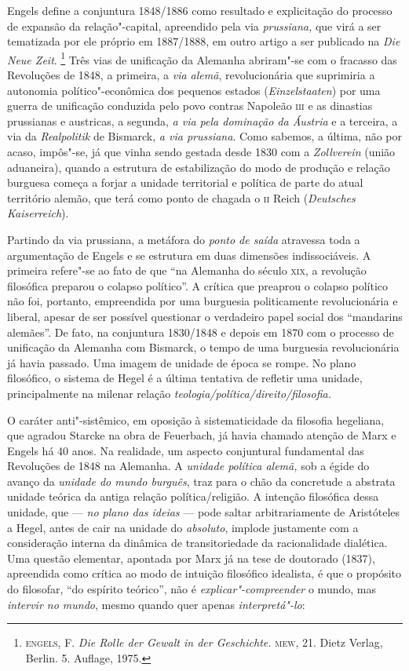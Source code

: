 Engels define a conjuntura 1848/1886 como resultado e explicitação do
processo de expansão da relação"-capital, apreendido pela via
\emph{prussiana,} que virá a ser tematizada por ele próprio em
1887/1888, em outro artigo a ser publicado na \emph{Die Neue Zeit}.
\footnote{\textsc{engels}, F. \emph{Die Rolle der Gewalt in der Geschichte.} \textsc{mew},
  21. Dietz Verlag, Berlin. 5. Auflage, 1975.} Três vias de unificação
da Alemanha abriram"-se com o fracasso das Revoluções de 1848, a
primeira, a \emph{via alemã}, revolucionária que suprimiria a autonomia
político"-econômica dos pequenos estados (\emph{Einzelstaaten}) por uma
guerra de unificação conduzida pelo povo contras Napoleão \textsc{iii} e as
dinastias prussianas e austricas, a segunda, \emph{a via pela dominação
da Áustria} e a terceira, a via da \emph{Realpolitik} de Bismarck, \emph{a via prussiana}. Como sabemos, a última, não por acaso, impôs"-se, já
que vinha sendo gestada desde 1830 com a \emph{Zollverein} (união
aduaneira), quando a estrutura de estabilização do modo de produção e
relação burguesa começa a forjar a unidade territorial e política de
parte do atual território alemão, que terá como ponto de chagada o \textsc{ii}
Reich (\emph{Deutsches Kaiserreich}).

Partindo da via prussiana, a metáfora do \emph{ponto de saída} atravessa
toda a argumentação de Engels e se estrutura em duas dimensões
indissociáveis. A primeira refere"-se ao fato de que ``na Alemanha do
século \textsc{xix}, a revolução filosófica preparou o colapso político''. A
crítica que preaprou o colapso político não foi, portanto, empreendida
por uma burguesia politicamente revolucionária e liberal, apesar de ser
possível questionar o verdadeiro papel social dos ``mandarins alemães''.
De fato, na conjuntura 1830/1848 e depois em 1870 com o processo de
unificação da Alemanha com Bismarck, o tempo de uma burguesia
revolucionária já havia passado. Uma imagem de unidade de época se
rompe. No plano filosófico, o sistema de Hegel é a última tentativa de
refletir uma unidade, principalmente na milenar relação
\emph{teologia/política/direito/filosofia.}

O caráter anti"-sistêmico, em oposição à sistematicidade da filosofia
hegeliana, que agradou Starcke na obra de Feuerbach, já havia chamado
atenção de Marx e Engels há 40 anos. Na realidade, um aspecto
conjuntural fundamental das Revoluções de 1848 na Alemanha. A
\emph{unidade política alemã,} sob a égide do avanço da \emph{unidade do
mundo burguês}, traz para o chão da concretude a abstrata unidade
teórica da antiga relação política/religião. A intenção filosófica dessa
unidade, que --- \emph{no plano das ideias} --- pode saltar arbitrariamente
de Aristóteles a Hegel, antes de cair na unidade do \emph{absoluto},
implode justamente com a consideração interna da dinâmica de
transitoriedade da racionalidade dialética. Uma questão elementar,
apontada por Marx já na tese de doutorado (1837), apreendida como
crítica ao modo de intuição filosófico idealista, é que o propósito do
filosofar, ``do espírito teórico'', não é \emph{explicar"-compreender} o
mundo, mas \emph{intervir no mundo}, mesmo quando quer apenas
\emph{interpretá"-lo}:

